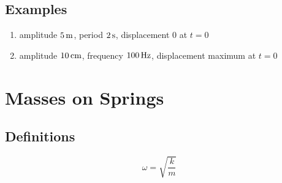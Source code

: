 \documentclass{exam}
\begin{document}
  \subsection{Examples}
  \begin{enumerate}
    \item amplitude $\unit[5]{m}$, period $\unit[2]{s}$, displacement 0 at $t = 0$
    \item amplitude $\unit[10]{cm}$, frequency $\unit[100]{Hz}$, displacement maximum at $t = 0$ 
  \end{enumerate}

  \section{Masses on Springs}
  \subsection{Definitions}
  \[
    \omega = \sqrt{\frac{k}{m}}
  \]
          
\end{document}
